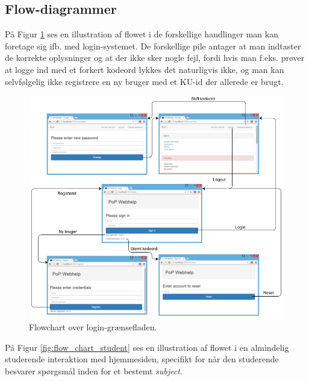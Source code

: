 \documentclass[11pt, a4paper]{article}
\begin{document}
\FloatBarrier

\subsection{Flow-diagrammer}
\label{sub:flow_charts}
På Figur \ref{fig:flow_chart_login} ses en illustration af flowet i de forskellige handlinger man kan foretage sig ifb. med login-systemet. De forskellige pile antager at man indtaster de korrekte oplysninger og at der ikke sker nogle fejl, fordi hvis man f.eks. prøver at logge ind med et forkert kodeord lykkes det naturligvis ikke, og man kan selvfølgelig ikke registrere en ny bruger med et KU-id der allerede er brugt.

\begin{figure}[htpb]
    \centering
    \includegraphics[width=1\linewidth]{figures/interface/flow_login.png}
    \caption{Flowchart over login-grænsefladen.}
    \label{fig:flow_chart_login}
\end{figure}
\FloatBarrier

På Figur \ref{fig:flow_chart_student} ses en illustration af flowet i en almindelig studerende interaktion med hjemmesiden, specifikt for når den studerende besvarer spørgsmål inden for et bestemt \emph{subject}.
\end{document}
